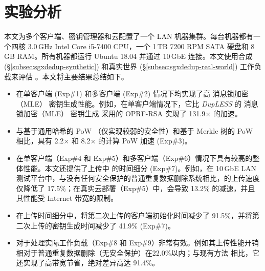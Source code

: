 \section{实验分析}
\label{sec:sgxdedup-evaluation}

本文为多个客户端、密钥管理器和云配置了一个 LAN 机器集群。每台机器都有一个四核 3.0\,GHz Intel Core i5-7400 CPU，一个 1\,TB 7200 RPM SATA 硬盘和 8\,GB RAM。所有机器都运行 Ubuntu 18.04 并通过 10\,GbE 连接。本文使用合成 (\S\ref{subsec:sgxdedup-synthetic}) 和真实世界 (\S\ref{subsec:sgxdedup-real-world}) 工作负载来评估 \sysnameS。本文将主要结果总结如下。

\begin{itemize}[leftmargin=*]
\item \sysnameS 在单客户端 (Exp\#1) 和多客户端 (Exp\#2) 情况下均实现了高 消息锁加密（MLE） 密钥生成性能。例如，在单客户端情况下，它比 {\em DupLESS} 的 消息锁加密（MLE） 密钥生成 \cite{bellare2013DupLESS} 采用的 OPRF-RSA 实现了 131.9$\times$ 的加速。
\item \sysnameS 与基于通用哈希的 PoW \cite{xu2013weak}（仅实现较弱的安全性）和基于 Merkle 树的 PoW \cite{halevi11} 相比，具有 2.2$\times$ 和 8.2$\times$ 的计算 PoW 加速 (Exp\#3)。
\item \sysnameS 在单客户端（Exp\#4 和 Exp\#5）和多客户端（Exp\#6）情况下具有较高的整体性能。本文还提供了上传中 \sysnameS 的时间细分 (Exp\#7)。例如，在 10\,GbE LAN 测试平台中，与没有任何安全保护的普通重复数据删除系统相比，\sysnameS 的上传速度仅降低了 17.5\%；在真实云部署（Exp\#5）中，\sysnameS 会导致 13.2\% 的减速，并且其性能受 Internet 带宽的限制。
\item 在上传时间细分中，\sysnameS 将第二次上传的客户端初始化时间减少了 91.5\%，并将第二次上传的密钥生成时间减少了 41.9\% (Exp\#7)。
\item \sysnameS 对于处理实际工作负载（Exp\#8 和 Exp\#9）非常有效。例如其上传性能开销相对于普通重复数据删除（无安全保护）在22.0\%以内；与现有方法 \cite{li15,harnik10} 相比，它还实现了高带宽节省，绝对差异高达 91.4\%。
\end{itemize}


